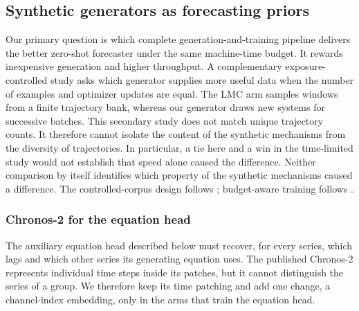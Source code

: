 \subsection{Synthetic generators as forecasting priors}
\label{sec:foundation-prior-design}

Our primary question is which complete generation-and-training pipeline
delivers the better zero-shot forecaster under the same machine-time budget.
It rewards inexpensive generation and higher throughput. A complementary
exposure-controlled study asks which generator supplies more useful data when
the number of examples and optimizer updates are equal. The LMC arm samples
windows from a finite trajectory bank, whereas our generator draws new
systems for successive batches. This secondary study does not match unique
trajectory counts. It therefore cannot isolate the content of the synthetic
mechanisms from the diversity of trajectories. In particular, a tie here and
a win in the time-limited study would not establish that speed alone caused
the difference.
Neither comparison by itself
identifies which property of the synthetic mechanisms caused a difference. The
controlled-corpus design follows \citet{nagpal2026mixdontpick}; budget-aware
training follows \citet{kaddour2023notrainnogain}.

\subsubsection{Chronos-2 for the equation head}
\label{sec:chronos-explainability-modifications}
The auxiliary equation head described below must recover, for every series,
which lags and which other series its generating equation uses. The published
Chronos-2 represents individual time steps inside its patches, but it cannot
distinguish the series of a group. We therefore keep its time patching and add
one change, a channel-index embedding, only in the arms that train the
equation head.

